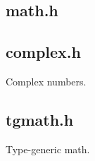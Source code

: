 
\subsection{math.h}

\subsection{complex.h}

Complex numbers.

\subsection{tgmath.h}

Type-generic math.
